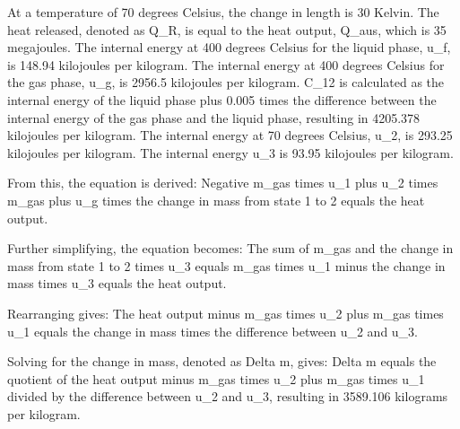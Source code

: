 At a temperature of 70 degrees Celsius, the change in length is 30 Kelvin.
The heat released, denoted as Q_R, is equal to the heat output, Q_aus, which is 35 megajoules.
The internal energy at 400 degrees Celsius for the liquid phase, u_f, is 148.94 kilojoules per kilogram.
The internal energy at 400 degrees Celsius for the gas phase, u_g, is 2956.5 kilojoules per kilogram.
C_12 is calculated as the internal energy of the liquid phase plus 0.005 times the difference between the internal energy of the gas phase and the liquid phase, resulting in 4205.378 kilojoules per kilogram.
The internal energy at 70 degrees Celsius, u_2, is 293.25 kilojoules per kilogram.
The internal energy u_3 is 93.95 kilojoules per kilogram.

From this, the equation is derived:
Negative m_gas times u_1 plus u_2 times m_gas plus u_g times the change in mass from state 1 to 2 equals the heat output.

Further simplifying, the equation becomes:
The sum of m_gas and the change in mass from state 1 to 2 times u_3 equals m_gas times u_1 minus the change in mass times u_3 equals the heat output.

Rearranging gives:
The heat output minus m_gas times u_2 plus m_gas times u_1 equals the change in mass times the difference between u_2 and u_3.

Solving for the change in mass, denoted as Delta m, gives:
Delta m equals the quotient of the heat output minus m_gas times u_2 plus m_gas times u_1 divided by the difference between u_2 and u_3, resulting in 3589.106 kilograms per kilogram.